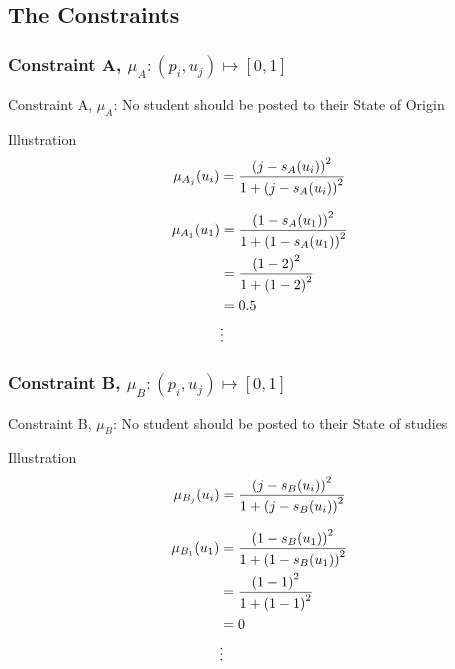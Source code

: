 \documentclass[10pt]{beamer}
\begin{document}
			\subsection{The Constraints}
			\begin{frame}
				\frametitle{Constraint A, $\mu_A\colon (p_i,u_j)\mapsto [0,1]$}
				Constraint A, $\mu_A$: No student should be posted to their State of Origin
				\begin{block}{Illustration}
					\begin{equation}
						\mu_{A_j}(u_i) = \frac{\left(j-s_A(u_i)\right)^2}{1 + \left(j-s_A(u_i)\right)^2} \notag
					\end{equation}
				\end{block}
				\begin{example}
					\begin{align}
						\mu_{A_1}(u_1) &= \frac{\left(1-s_A(u_1)\right)^2}{1 + \left(1-s_A(u_1)\right)^2} \notag\\
						&= \frac{\left(1-2\right)^2}{1 + \left(1-2\right)^2} \notag \\
						&= 0.5 \notag \\
						&\vdots \notag
					\end{align}
				\end{example}
			\end{frame}
			\begin{frame}
				\frametitle{Constraint B, $\mu_B\colon (p_i,u_j)\mapsto [0,1]$}
				Constraint B, $\mu_B$: No student should be posted to their State of studies
				\begin{block}{Illustration}
					\begin{equation}
						\mu_{B_j}(u_i) = \frac{\left(j-s_B(u_i)\right)^2}{1 + \left(j-s_B(u_i)\right)^2} \notag
					\end{equation}
				\end{block}
				\begin{example}
					\begin{align}
						\mu_{B_1}(u_1) &= \frac{\left(1-s_B(u_1)\right)^2}{1 + \left(1-s_B(u_1)\right)^2}\notag\\
						&= \frac{\left(1-1\right)^2}{1 + \left(1-1\right)^2} \notag \\
						&= 0 \notag \\
						&\vdots \notag
					\end{align}
				\end{example}
			\end{frame}
\end{document}
